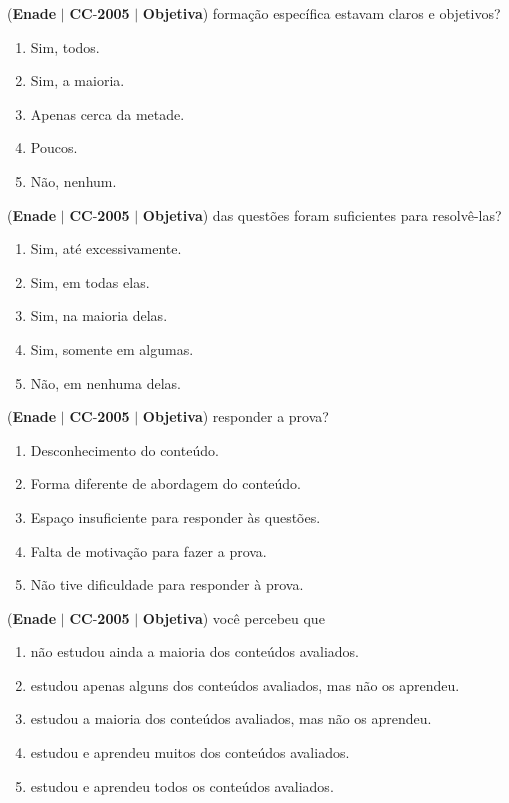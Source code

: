\documentclass{exam}
\begin{document}
\begin{questions}
\question (\textbf{Enade} $|$ \textbf{CC}-\textbf{2005} $|$ \textbf{Objetiva})
formação específica estavam claros e objetivos?
	\begin{enumerate}[label=\alph*)]
		\item  Sim, todos.
		\item  Sim, a maioria.
		\item  Apenas cerca da metade.
		\item  Poucos.
		\item  Não, nenhum.
	\end{enumerate}

\question (\textbf{Enade} $|$ \textbf{CC}-\textbf{2005} $|$ \textbf{Objetiva})
das questões foram suficientes para resolvê-las?
	\begin{enumerate}[label=\alph*)]
		\item  Sim, até excessivamente.
		\item  Sim, em todas elas.
		\item  Sim, na maioria delas.
		\item  Sim, somente em algumas.
		\item  Não, em nenhuma delas.
	\end{enumerate}

\question (\textbf{Enade} $|$ \textbf{CC}-\textbf{2005} $|$ \textbf{Objetiva})
responder a prova?
	\begin{enumerate}[label=\alph*)]
		\item  Desconhecimento do conteúdo.
		\item  Forma diferente de abordagem do conteúdo.
		\item  Espaço insuficiente para responder às questões.
		\item  Falta de motivação para fazer a prova.
		\item  Não tive dificuldade para responder à prova.
	\end{enumerate}

\question (\textbf{Enade} $|$ \textbf{CC}-\textbf{2005} $|$ \textbf{Objetiva})
você percebeu que
	\begin{enumerate}[label=\alph*)]
		\item  não estudou ainda a maioria dos conteúdos avaliados.
		\item  estudou apenas alguns dos conteúdos avaliados, mas não
os aprendeu.
		\item  estudou a maioria dos conteúdos avaliados, mas não os
aprendeu.
		\item  estudou e aprendeu muitos dos conteúdos avaliados.
		\item  estudou e aprendeu todos os conteúdos avaliados.
	\end{enumerate}


\end{questions}
\end{document}

